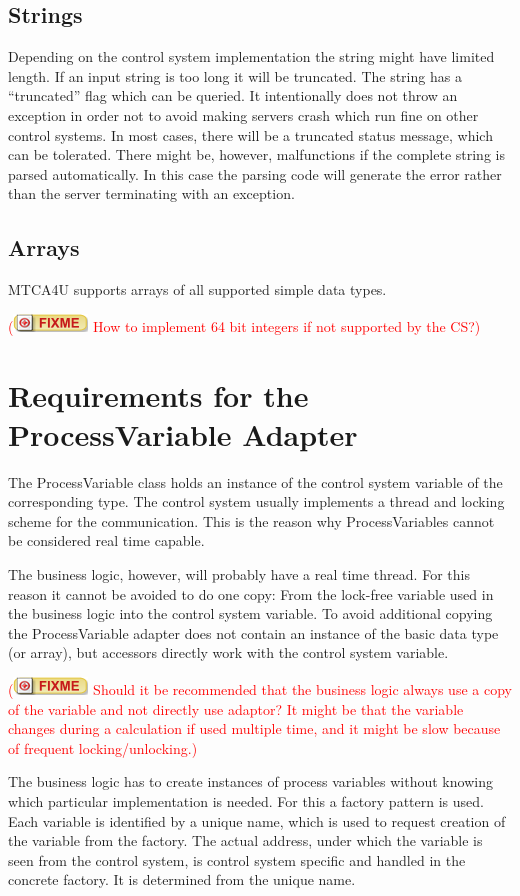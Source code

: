 \documentclass[11pt,a4paper]{scrartcl}
\newcounter{nFixmes}
\newcommand{\fixme}[1]{\addtocounter{nFixmes}{1}\textcolor{red}{(\includegraphics[height=2ex]{fixme} #1)}\xspace}
\begin{document}
\subsection{Strings}

Depending on the control system implementation the string might have limited
length. If an input string is too long it will be truncated. The string has a
“truncated” flag which can be queried. It intentionally does not throw an
exception in order not to avoid making servers crash which run fine on other
control systems. In most cases, there will be a truncated status message, which
can be tolerated. There might be, however, malfunctions if the complete string
is parsed automatically. In this case the parsing code will generate the error
rather than the server terminating with an exception. 

\subsection{Arrays}

MTCA4U supports arrays of all supported simple data types. \fixme{How to implement 64 bit integers if not supported by the CS?}

\section{Requirements for the ProcessVariable Adapter}\label{section_process_variable_adapter}

The ProcessVariable class holds an instance of the control system variable of
the corresponding type. The control system usually implements a thread and
locking scheme for the communication. This is the reason why ProcessVariables
cannot be considered real time capable. 

The business logic, however, will probably have a real time thread. For this
reason it cannot be avoided to do one copy: From the lock-free variable used
in the business logic into the control system variable. To avoid additional
copying the ProcessVariable adapter does not contain an instance of the basic
data type (or array), but accessors directly work with the control system
variable. \fixme{Should it be recommended that the business logic always use a
  copy of the variable and not directly use adaptor? It might be that the
  variable changes during a calculation if used multiple time, and it might be
  slow because of frequent locking/unlocking.}  

The business logic has to create instances of process variables without
knowing which particular implementation is needed. For this a factory pattern
is used. Each variable is identified by a unique name, which is used to
request creation of the variable from the factory. The actual address, under
which the variable is seen from the control system, is control system specific
and handled in the concrete factory. It is determined from the unique name. 
\end{document}
